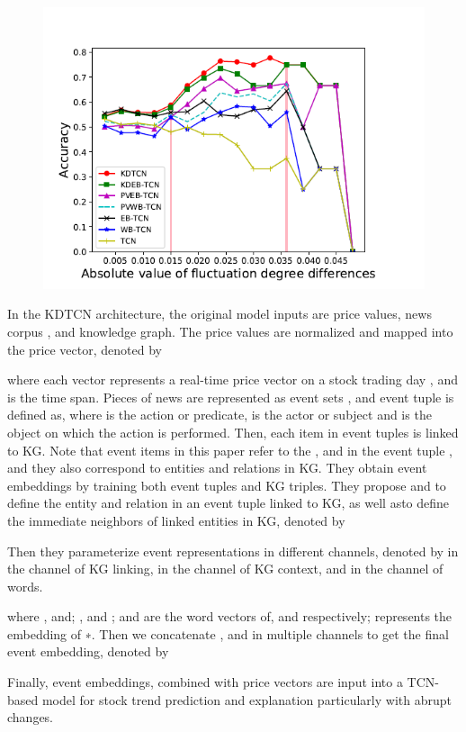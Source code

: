 \begin{figure}[h]
    \includegraphics[width=\textwidth]{../Figures/ch_3_11.png}
\end{figure}

In the KDTCN architecture, the original model inputs are price values, news corpus , and knowledge graph. The price values are normalized and mapped into the price vector, denoted by

where each vector  represents a real-time price vector on a stock trading day , and  is the time span. Pieces of news are represented as event sets , and event tuple is defined as, where  is the action or predicate,  is the actor or subject and  is the object on which the action is performed. Then, each item in event tuples is linked to KG. Note that event items in this paper refer to the ,  and  in the event tuple , and they also correspond to entities and relations in KG. They obtain event embeddings  by training both event tuples and KG triples. 
They propose  and  to define the entity and relation in an event tuple linked to KG, as well asto define the immediate neighbors of linked entities in KG, denoted by

Then they parameterize event representations in different channels, denoted by in the channel of KG linking,  in the channel of KG context, and   in the channel of words.

where , and; , and ; and are the word vectors of, and  respectively;  represents the embedding of ∗. Then we concatenate ,  and  in multiple channels to get the final event embedding, denoted by

Finally, event embeddings, combined with price vectors are input into a TCN-based model for stock trend prediction and explanation particularly with abrupt changes.

